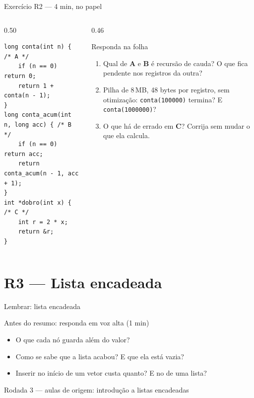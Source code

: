 \documentclass[aspectratio=169]{beamer}
\newcommand{\rodada}[4]{%
  \begin{frame}{Lembrar: #2}
    \begin{block}{Antes do resumo: responda em voz alta (1 min)}
      #4
    \end{block}
    \vfill
    {\small\textcolor{UFSGray}{Rodada #1 --- aulas de origem:} #3}
  \end{frame}}
\begin{document}
\begin{frame}[fragile]{Exercício R2 --- 4 min, no papel}
  \begin{columns}[T]
    \begin{column}{0.50\textwidth}
\begin{lstlisting}[style=numC]
long conta(int n) {              /* A */
    if (n == 0) return 0;
    return 1 + conta(n - 1);
}
long conta_acum(int n, long acc) { /* B */
    if (n == 0) return acc;
    return conta_acum(n - 1, acc + 1);
}
int *dobro(int x) {              /* C */
    int r = 2 * x;
    return &r;
}
\end{lstlisting}
    \end{column}
    \begin{column}{0.46\textwidth}
      \begin{block}{Responda na folha}
        \small
        \begin{enumerate}
          \item[(a)] Qual de \textbf{A} e \textbf{B} é recursão de cauda? O
            que fica pendente nos registros da outra?
          \item[(b)] Pilha de 8\,MB, 48 bytes por registro, sem otimização:
            \texttt{conta(100000)} termina? E \texttt{conta(1000000)}?
          \item[(c)] O que há de errado em \textbf{C}? Corrija sem mudar o
            que ela calcula.
        \end{enumerate}
      \end{block}
    \end{column}
  \end{columns}
\end{frame}

\section{R3 --- Lista encadeada}

\rodada{3}{lista encadeada}{introdução a listas encadeadas}{
  \begin{itemize}
    \item O que cada nó guarda além do valor?
    \item Como se sabe que a lista acabou? E que ela está vazia?
    \item Inserir no início de um vetor custa quanto? E no de uma lista?
  \end{itemize}}
\end{document}
